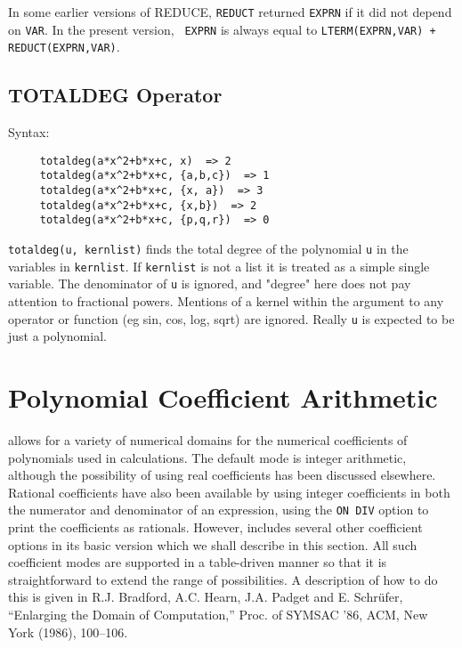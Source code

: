 {\COMPATNOTE} In some earlier versions of REDUCE, \texttt{REDUCT} returned
\texttt{EXPRN} if it did not depend on \texttt{VAR}.  In the present version, {\tt
EXPRN} is always equal to \texttt{LTERM(EXPRN,VAR) + REDUCT(EXPRN,VAR)}.

\subsection{TOTALDEG Operator}
\hypertarget{operator:TOTALDEG}{}

Syntax:
\begin{verbatim}
     totaldeg(a*x^2+b*x+c, x)  => 2
     totaldeg(a*x^2+b*x+c, {a,b,c})  => 1
     totaldeg(a*x^2+b*x+c, {x, a})  => 3
     totaldeg(a*x^2+b*x+c, {x,b})  => 2
     totaldeg(a*x^2+b*x+c, {p,q,r})  => 0
\end{verbatim}
\texttt{totaldeg(u, kernlist)} finds the total degree of the polynomial \texttt{u} in
the variables in \texttt{kernlist}. If \texttt{kernlist} is not a list it is treated
as a simple single variable.
The denominator of \texttt{u} is ignored, and "degree" here does not pay attention
to fractional powers. Mentions of a kernel within the argument to any
operator or function (eg sin, cos, log, sqrt) are ignored. Really \texttt{u} is
expected to be just a polynomial.

\section{Polynomial Coefficient Arithmetic}
{\REDUCE} allows for a variety of numerical domains for the numerical
coefficients of polynomials used in calculations.  The default mode is
integer arithmetic, although the possibility of using real coefficients
 has been discussed elsewhere.  Rational
coefficients have also been available by using integer coefficients in
both the numerator and denominator of an expression, using the 
\texttt{ON DIV} option to print the coefficients as rationals.
However, {\REDUCE} includes several other coefficient options in its basic
version which we shall describe in this section.  All such coefficient
modes are supported in a table-driven manner so that it is
straightforward to extend the range of possibilities.  A description of
how to do this is given in R.J. Bradford, A.C. Hearn, J.A. Padget and
E. Schr\"ufer, ``Enlarging the {\REDUCE} Domain of Computation,'' Proc. of
SYMSAC '86, ACM, New York (1986), 100--106.


